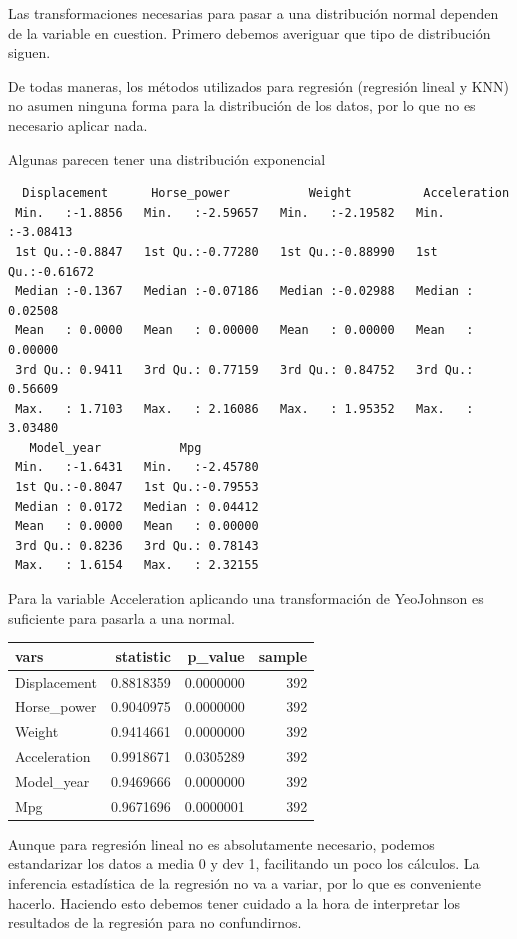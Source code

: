 Las transformaciones necesarias para pasar a una distribución normal dependen de la variable en cuestion. Primero debemos averiguar que tipo de distribución siguen.

De todas maneras, los métodos utilizados para regresión (regresión lineal y KNN) no asumen ninguna forma para la distribución de los datos, por lo que no es necesario aplicar nada.

Algunas parecen tener una distribución exponencial

\begin{verbatim}
  Displacement      Horse_power           Weight          Acceleration     
 Min.   :-1.8856   Min.   :-2.59657   Min.   :-2.19582   Min.   :-3.08413  
 1st Qu.:-0.8847   1st Qu.:-0.77280   1st Qu.:-0.88990   1st Qu.:-0.61672  
 Median :-0.1367   Median :-0.07186   Median :-0.02988   Median : 0.02508  
 Mean   : 0.0000   Mean   : 0.00000   Mean   : 0.00000   Mean   : 0.00000  
 3rd Qu.: 0.9411   3rd Qu.: 0.77159   3rd Qu.: 0.84752   3rd Qu.: 0.56609  
 Max.   : 1.7103   Max.   : 2.16086   Max.   : 1.95352   Max.   : 3.03480  
   Model_year           Mpg          
 Min.   :-1.6431   Min.   :-2.45780  
 1st Qu.:-0.8047   1st Qu.:-0.79553  
 Median : 0.0172   Median : 0.04412  
 Mean   : 0.0000   Mean   : 0.00000  
 3rd Qu.: 0.8236   3rd Qu.: 0.78143  
 Max.   : 1.6154   Max.   : 2.32155  
\end{verbatim}

Para la variable Acceleration aplicando una transformación de YeoJohnson es suficiente para pasarla a una normal.

\begin{tabular}{l|r|r|r}
\hline
vars & statistic & p\_value & sample\\
\hline
Displacement & 0.8818359 & 0.0000000 & 392\\
\hline
Horse\_power & 0.9040975 & 0.0000000 & 392\\
\hline
Weight & 0.9414661 & 0.0000000 & 392\\
\hline
Acceleration & 0.9918671 & 0.0305289 & 392\\
\hline
Model\_year & 0.9469666 & 0.0000000 & 392\\
\hline
Mpg & 0.9671696 & 0.0000001 & 392\\
\hline
\end{tabular}

Aunque para regresión lineal no es absolutamente necesario, podemos estandarizar los datos a media 0 y dev 1, facilitando un poco los cálculos. La inferencia estadística de la regresión no va a variar, por lo que es conveniente hacerlo. Haciendo esto debemos tener cuidado a la hora de interpretar los resultados de la regresión para no confundirnos.


